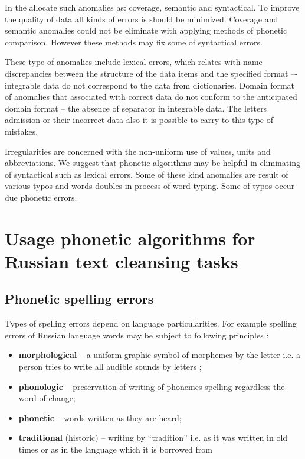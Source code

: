 \documentclass[conference,a4paper]{IEEEtran}
\begin{document}
In the \cite{Osipov-2002} allocate such anomalies as: coverage, semantic and syntactical. To improve the quality of data all kinds of errors is should be minimized. Coverage and semantic anomalies could not be eliminate with applying methods of phonetic comparison. However these methods may fix some of syntactical errors.

These type of anomalies include lexical errors, which relates with name discrepancies between the structure of the data items and the specified format –- integrable data do not correspond to the data from dictionaries.  Domain format of anomalies that associated with correct data do not conform to the anticipated domain format – the absence of separator in integrable data. The letters admission or their incorrect data also it is possible to carry to this type of mistakes.

Irregularities are concerned with the non-uniform use of values, units and abbreviations.
We suggest that phonetic algorithms may be helpful in eliminating of syntactical such as lexical errors. Some of these kind anomalies are result of various typos and words doubles in process of word typing. Some of typos occur due phonetic errors.

\section{Usage phonetic algorithms for Russian text cleansing tasks}
\subsection{Phonetic spelling errors}
Types of spelling errors depend on language particularities. For example spelling errors of Russian language words may be subject to following principles \cite{Skripnik-2010}:
\begin{itemize}
\item \textbf{morphological} – a uniform graphic symbol of morphemes by the letter i.e. a person tries to write all audible sounds by letters \cite{Valgina-2002};
\item \textbf{phonologic} – preservation of writing of phonemes spelling regardless the word of change;
\item \textbf{phonetic} – words written as they are heard;
\item \textbf{traditional} (historic) – writing by “tradition” i.e. as it was written in old times or as in the language which it is borrowed from
\end{itemize}
\end{document}
